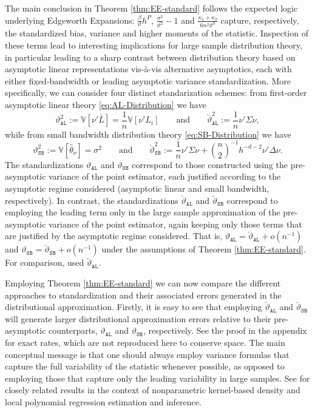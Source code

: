 \documentclass[11pt]{article}
\numberwithin{equation}{section}
\theoremstyle{definition}
\newcommand{\V}{\mathbb{V}}
\newcommand{\Scale}{\vartheta}
\begin{document}
The main conclusion in Theorem \ref{thm:EE-standard} follows the expected logic underlying Edgeworth Expansions: $\frac{\beta}{\Scale}h^P$, $\tfrac{\sigma^2}{\Scale^2} - 1$ and $\frac{\kappa_1+\kappa_2}{6n^2\Scale^3}$ capture, respectively, the standardized bias, variance and higher moments of the statistic. Inspection of these terms lead to interesting implications for large sample distribution theory, in particular leading to a sharp contrast between distribution theory based on asymptotic linear representations vis-\`a-vis alternative asymptotics, each with either fixed-bandwidth or leading asymptotic variance standardization. More specifically, we can consider four distinct standarization schemes: from first-order asymptotic linear theory \eqref{eq:AL-Distribution} we have
\[\Scale_\mathtt{AL}^2 := \V[\nu'\bar{L}] = \frac{1}{n}\V[\nu'L_i] \qquad\text{and}\qquad
  \breve{\Scale}_\mathtt{AL}^2 := \frac{1}{n}\nu'\Sigma\nu,\]
while from small bandwidth distribution theory \eqref{eq:SB-Distribution} we have
\[\Scale_\mathtt{SB}^2 := \V[\widehat{\theta}_\nu] = \sigma^2 \qquad\text{and}\qquad
  \breve{\Scale}_\mathtt{SB}^2 := \frac{1}{n}\nu'\Sigma\nu + \binom{n}{2}^{-1} h^{-d-2} \nu'\Delta\nu.\]
The standardizations $\Scale_\mathtt{AL}$ and $\Scale_\mathtt{SB}$ correspond to those constructed using the pre-asymptotic variance of the point estimator, each justified according to the asymptotic regime considered (asymptotic linear and small bandwidth, respectively). In contrast, the standardizations $\breve{\Scale}_\mathtt{AL}$ and $\breve{\Scale}_\mathtt{SB}$ correspond to employing the leading term only in the large sample approximation of the pre-asymptotic variance of the point estimator, again keeping only those terms that are justified by the asymptotic regime considered. That is, $\Scale_\mathtt{AL} = \breve{\Scale}_\mathtt{AL}+o(n^{-1})$ and $\Scale_\mathtt{SB} = \breve{\Scale}_\mathtt{SB}+o(n^{-1})$ under the assumptions of Theorem \ref{thm:EE-standard}. For comparison, \citet[Theorem 1]{Nishiyama-Robinson_2000_ECMA} used $\breve{\Scale}_\mathtt{AL}$.

Employing Theorem \ref{thm:EE-standard} we can now compare the different approaches to standardization and their associated errors generated in the distributional approximation. Firstly, it is easy to see that employing $\breve{\Scale}_\mathtt{AL}$ and $\breve{\Scale}_\mathtt{SB}$ will generate larger distributional approximation errors relative to their pre-asymptotic counterparts, $\Scale_\mathtt{AL}$ and $\Scale_\mathtt{SB}$, respectively. See the proof in the appendix for exact rates, which are not reproduced here to conserve space. The main conceptual message is that one should always employ variance formulas that capture the full variability of the statistic whenever possible, as opposed to employing those that capture only the leading variability in large samples. See \citet{Calonico-Cattaneo-Farrell_2018_JASA,Calonico-Cattaneo-Farrell_2022_Bernoulli} for closely related results in the context of nonparametric kernel-based density and local polynomial regression estimation and inference.
\end{document}
